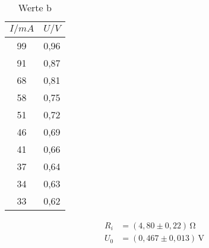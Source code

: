 

\begin{table}
  \centering
  \caption{Werte b}
  \label{tab:data2}
  \begin{tabular}{c c}
    \toprule $I/mA$ & $U/V$ \\
    \midrule
    99 & 0,96\\
    91 & 0,87\\
    68 & 0,81\\
    58 & 0,75\\
    51 & 0,72\\
    46 & 0,69\\
    41 & 0,66\\
    37 & 0,64\\
    34 & 0,63\\
    33 & 0,62\\
    \bottomrule
  \end{tabular}
\end{table}
\begin{align*}
  R_i &= (4,80 \pm 0,22)\, \mathrm{\Omega}\\
  U_0 &= (0,467 \pm 0,013)\, \mathrm{V}
\end{align*}

